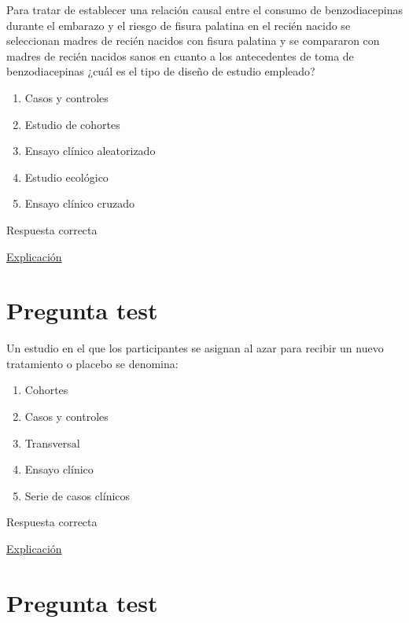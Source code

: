 \documentclass[
]{book}
\providecommand{\tightlist}{%
  \setlength{\itemsep}{0pt}\setlength{\parskip}{0pt}}
\begin{document}
Para tratar de establecer una relación causal entre el consumo de benzodiacepinas durante el embarazo y el riesgo de fisura palatina en el recién nacido se seleccionan madres de recién nacidos con fisura palatina y se compararon con madres de recién nacidos sanos en cuanto a los antecedentes de toma de benzodiacepinas ¿cuál es el tipo de diseño de estudio empleado?

\begin{enumerate}
\def\labelenumi{\alph{enumi})}
\tightlist
\item
  Casos y controles
\item
  Estudio de cohortes
\item
  Ensayo clínico aleatorizado
\item
  Estudio ecológico
\item
  Ensayo clínico cruzado
\end{enumerate}

Respuesta correcta

\href{http://www.scielo.org.pe/scielo.php?script=sci_arttext\&pid=S2308-05312020000100138}{Explicación}

\hypertarget{pregunta-test-38}{%
\section{Pregunta test}\label{pregunta-test-38}}

Un estudio en el que los participantes se asignan al azar para recibir un nuevo tratamiento o placebo se denomina:

\begin{enumerate}
\def\labelenumi{\alph{enumi})}
\tightlist
\item
  Cohortes
\item
  Casos y controles
\item
  Transversal
\item
  Ensayo clínico
\item
  Serie de casos clínicos
\end{enumerate}

Respuesta correcta

\href{https://www.geicam.org/que-hacemos/ensayos-clinicos/que-es-un-ensayo-clinico}{Explicación}

\hypertarget{pregunta-test-39}{%
\section{Pregunta test}\label{pregunta-test-39}}
\end{document}
